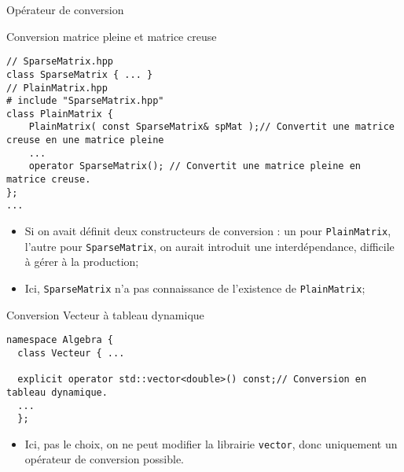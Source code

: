 \documentclass[handout,10pt]{beamer}
\begin{document}
\begin{frame}[fragile]{Opérateur de conversion}
\tiny
\begin{exampleblock}{Conversion matrice pleine et matrice creuse}
\begin{lstlisting}
// SparseMatrix.hpp
class SparseMatrix { ... }
// PlainMatrix.hpp
# include "SparseMatrix.hpp"
class PlainMatrix {
    PlainMatrix( const SparseMatrix& spMat );// Convertit une matrice creuse en une matrice pleine
    ...
    operator SparseMatrix(); // Convertit une matrice pleine en matrice creuse.
};
...
\end{lstlisting}
\begin{itemize}
\item Si on avait définit deux constructeurs de conversion : un pour \lstinline$PlainMatrix$, l'autre pour \lstinline$SparseMatrix$, on aurait introduit une interdépendance, difficile à gérer à la production;
\item Ici, \lstinline$SparseMatrix$ n'a pas connaissance de l'existence de \lstinline$PlainMatrix$;
\end{itemize}
\end{exampleblock}

\begin{exampleblock}{Conversion Vecteur à tableau dynamique}
\begin{lstlisting}
namespace Algebra {
  class Vecteur { ...
  
  explicit operator std::vector<double>() const;// Conversion en tableau dynamique.
  ...
  };
\end{lstlisting}
\begin{itemize}
\item Ici, pas le choix, on ne peut modifier la librairie \lstinline$vector$, donc uniquement un opérateur de conversion possible.
\end{itemize}
\end{exampleblock}
\end{frame}
\end{document}
